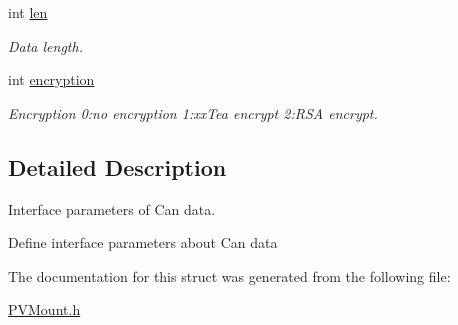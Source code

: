 \begin{DoxyCompactItemize}
int \hyperlink{struct_p_v_s_d_k___m_o_u_n_t_a_p_i___c_a_n___d_a_t_a_a7d08db338210f85a676338147171efbb}{len}
\begin{DoxyCompactList}\small\item\em Data length. \end{DoxyCompactList}\item 
\mbox{\label{struct_p_v_s_d_k___m_o_u_n_t_a_p_i___c_a_n___d_a_t_a_a7e193669093bd66e17058964dd3e6dc8}} 
int \hyperlink{struct_p_v_s_d_k___m_o_u_n_t_a_p_i___c_a_n___d_a_t_a_a7e193669093bd66e17058964dd3e6dc8}{encryption}
\begin{DoxyCompactList}\small\item\em Encryption 0\+:no encryption 1\+:xx\+Tea encrypt 2\+:R\+SA encrypt. \end{DoxyCompactList}\end{DoxyCompactItemize}


\subsection{Detailed Description}
Interface parameters of Can data. 

Define interface parameters about Can data 

The documentation for this struct was generated from the following file\+:\begin{DoxyCompactItemize}
\item 
\hyperlink{_p_v_mount_8h}{P\+V\+Mount.\+h}\end{DoxyCompactItemize}
